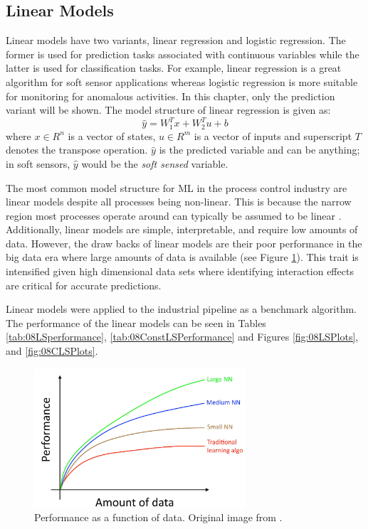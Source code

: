 \subsection{Linear Models}
Linear models have two variants, linear regression and logistic regression.  The former is used for prediction tasks associated with continuous variables while the latter is used for classification tasks.  For example, linear regression is a great algorithm for soft sensor applications whereas logistic regression is more suitable for monitoring for anomalous activities. In this chapter, only the prediction variant will be shown. The model structure of linear regression is given as:
\begin{equation}
    \hat{y} = W_1^Tx + W_2^Tu + b
    \label{eq:02LS}
\end{equation}
where $x \in R^n$ is a vector of states, $u \in R^{m}$ is a vector of inputs and superscript $T$ denotes the transpose operation.  $\hat{y}$ is the predicted variable and can be anything; in soft sensors, $\hat{y}$ would be the \textit{soft sensed} variable.  

The most common model structure for ML in the process control industry are linear models despite all processes being non-linear.  This is because the narrow region most processes operate around can typically be assumed to be linear \cite{process_control_ref13}.  Additionally, linear models are simple, interpretable, and require low amounts of data. However, the draw backs of linear models are their poor performance in the big data era where large amounts of data is available (see Figure \ref{fig:02learning_aggro}).  This trait is intensified given high dimensional data sets where identifying interaction effects are critical for accurate predictions.

Linear models were applied to the industrial pipeline as a benchmark algorithm.  The performance of the linear models can be seen in Tables \ref{tab:08LSperformance}, \ref{tab:08ConstLSPerformance} and Figures \ref{fig:08LSPlots}, and \ref{fig:08CLSPlots}. 

\begin{figure}
    \centering
    \includegraphics[width=0.7\textwidth]{images/ch2/02Learning_Aggro.png}
    \caption{Performance as a function of data.  Original image from \cite{deeplearning_course}.}
    \label{fig:02learning_aggro}
\end{figure}

